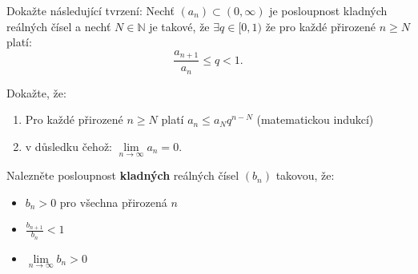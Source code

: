 
Dokažte následující tvrzení:
Nechť $(a_n) \subset (0, \infty)$ je posloupnost kladných reálných čísel a nechť $N \in \mathbb{N}$ je takové, že $\exists q \in [0,1)$ že pro každé přirozené $n \geq N$ platí:
$$\frac{a_{n+1}}{a_n} \leq q < 1.$$

Dokažte, že:
\begin{enumerate}
	\item  Pro každé přirozené $n \geq N$ platí $a_n \leq a_N q^{n - N}$ (matematickou indukcí)
	\item  v důsledku čehož: $\underset{n\rightarrow\infty}{\lim} a_n = 0$.
\end{enumerate}

Nalezněte posloupnost \textbf{kladných} reálných čísel $(b_n)$ takovou, že:
\begin{itemize}
	\item  $b_n > 0$ pro všechna přirozená $n$
	\item  $\frac{b_{n+1}}{b_n} < 1$
	\item  $\underset{n\rightarrow\infty}{\lim} b_n > 0$
\end{itemize}


